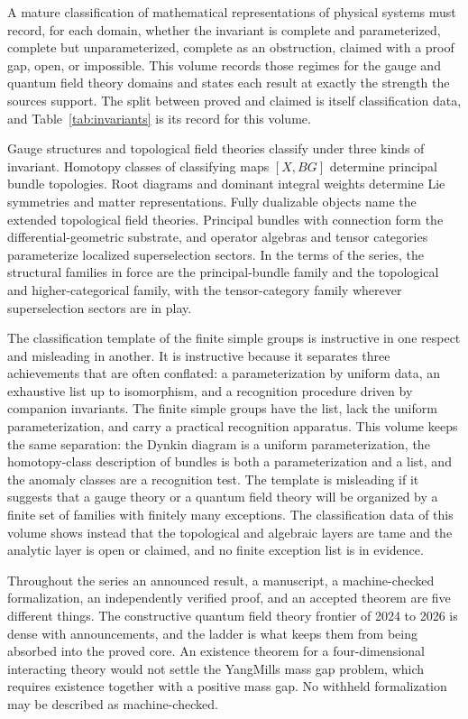 \documentclass[11pt,letterpaper]{article}
\theoremstyle{definition}
\theoremstyle{remark}
\begin{document}
A mature classification of mathematical representations of physical systems must record, for each domain, whether the invariant is complete and parameterized, complete but unparameterized, complete as an obstruction, claimed with a proof gap, open, or impossible. This volume records those regimes for the gauge and quantum field theory domains and states each result at exactly the strength the sources support. The split between proved and claimed is itself classification data, and Table~\ref{tab:invariants} is its record for this volume.

Gauge structures and topological field theories classify under three kinds of invariant. Homotopy classes of classifying maps $[X, BG]$ determine principal bundle topologies. Root diagrams and dominant integral weights determine Lie symmetries and matter representations. Fully dualizable objects name the extended topological field theories. Principal bundles with connection form the differential-geometric substrate, and operator algebras and tensor categories parameterize localized superselection sectors. In the terms of the series, the structural families in force are the principal-bundle family and the topological and higher-categorical family, with the tensor-category family wherever superselection sectors are in play.

The classification template of the finite simple groups is instructive in one respect and misleading in another. It is instructive because it separates three achievements that are often conflated: a parameterization by uniform data, an exhaustive list up to isomorphism, and a recognition procedure driven by companion invariants. The finite simple groups have the list, lack the uniform parameterization, and carry a practical recognition apparatus. This volume keeps the same separation: the Dynkin diagram is a uniform parameterization, the homotopy-class description of bundles is both a parameterization and a list, and the anomaly classes are a recognition test. The template is misleading if it suggests that a gauge theory or a quantum field theory will be organized by a finite set of families with finitely many exceptions. The classification data of this volume shows instead that the topological and algebraic layers are tame and the analytic layer is open or claimed, and no finite exception list is in evidence.

Throughout the series an announced result, a manuscript, a machine-checked formalization, an independently verified proof, and an accepted theorem are five different things. The constructive quantum field theory frontier of 2024 to 2026 is dense with announcements, and the ladder is what keeps them from being absorbed into the proved core. An existence theorem for a four-dimensional interacting theory would not settle the Yang\textendash{}Mills mass gap problem, which requires existence together with a positive mass gap. No withheld formalization may be described as machine-checked.
\end{document}
